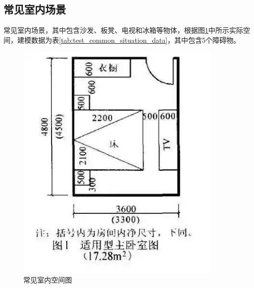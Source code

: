 \subsection{常见室内场景}
\par 常见室内场景，其中包含沙发、板凳、电视和冰箱等物体，根据图\ref{fig:test_common_situation_reality}中所示实际空间，建模数据为表\ref{tab:test_common_situation_data}，其中包含5个障碍物。
\begin{figure}[htb]
    \centering
    \caption{常见室内空间图}
    \label{fig:test_common_situation_reality}
    \includegraphics[width=10cm]{figures/test_common_situation_reality.JPG}
\end{figure}
\begin{table}[htb]
    \centering
    \caption{常见室内空间测试数据}
    \label{tab:test_common_situation_data}
\end{table}

